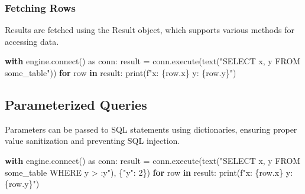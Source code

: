 \documentclass[
  letterpaper,
  DIV=11,
  numbers=noendperiod]{scrreprt}
\newenvironment{Shaded}{\begin{snugshade}}{\end{snugshade}}
\newcommand{\BuiltInTok}[1]{\textcolor[rgb]{0.00,0.23,0.31}{#1}}
\newcommand{\ControlFlowTok}[1]{\textcolor[rgb]{0.00,0.23,0.31}{\textbf{#1}}}
\newcommand{\DecValTok}[1]{\textcolor[rgb]{0.68,0.00,0.00}{#1}}
\newcommand{\ExtensionTok}[1]{\textcolor[rgb]{0.00,0.23,0.31}{#1}}
\newcommand{\ImportTok}[1]{\textcolor[rgb]{0.00,0.46,0.62}{#1}}
\newcommand{\KeywordTok}[1]{\textcolor[rgb]{0.00,0.23,0.31}{\textbf{#1}}}
\newcommand{\NormalTok}[1]{\textcolor[rgb]{0.00,0.23,0.31}{#1}}
\newcommand{\OperatorTok}[1]{\textcolor[rgb]{0.37,0.37,0.37}{#1}}
\newcommand{\SpecialCharTok}[1]{\textcolor[rgb]{0.37,0.37,0.37}{#1}}
\newcommand{\SpecialStringTok}[1]{\textcolor[rgb]{0.13,0.47,0.30}{#1}}
\newcommand{\StringTok}[1]{\textcolor[rgb]{0.13,0.47,0.30}{#1}}
\begin{document}
\subsubsection{Fetching Rows}\label{fetching-rows}

Results are fetched using the Result object, which supports various
methods for accessing data.

\begin{Shaded}
\begin{Highlighting}[]
\ControlFlowTok{with}\NormalTok{ engine.}\ExtensionTok{connect}\NormalTok{() }\ImportTok{as}\NormalTok{ conn:}
\NormalTok{    result }\OperatorTok{=}\NormalTok{ conn.execute(text(}\StringTok{"SELECT x, y FROM some\_table"}\NormalTok{))}
    \ControlFlowTok{for}\NormalTok{ row }\KeywordTok{in}\NormalTok{ result:}
        \BuiltInTok{print}\NormalTok{(}\SpecialStringTok{f"x: }\SpecialCharTok{\{}\NormalTok{row}\SpecialCharTok{.}\NormalTok{x}\SpecialCharTok{\}}\SpecialStringTok{  y: }\SpecialCharTok{\{}\NormalTok{row}\SpecialCharTok{.}\NormalTok{y}\SpecialCharTok{\}}\SpecialStringTok{"}\NormalTok{)}
\end{Highlighting}
\end{Shaded}

\subsection{Parameterized Queries}\label{parameterized-queries}

Parameters can be passed to SQL statements using dictionaries, ensuring
proper value sanitization and preventing SQL injection.

\begin{Shaded}
\begin{Highlighting}[]
\ControlFlowTok{with}\NormalTok{ engine.}\ExtensionTok{connect}\NormalTok{() }\ImportTok{as}\NormalTok{ conn:}
\NormalTok{    result }\OperatorTok{=}\NormalTok{ conn.execute(text(}\StringTok{"SELECT x, y FROM some\_table WHERE y \textgreater{} :y"}\NormalTok{), \{}\StringTok{"y"}\NormalTok{: }\DecValTok{2}\NormalTok{\})}
    \ControlFlowTok{for}\NormalTok{ row }\KeywordTok{in}\NormalTok{ result:}
        \BuiltInTok{print}\NormalTok{(}\SpecialStringTok{f"x: }\SpecialCharTok{\{}\NormalTok{row}\SpecialCharTok{.}\NormalTok{x}\SpecialCharTok{\}}\SpecialStringTok{  y: }\SpecialCharTok{\{}\NormalTok{row}\SpecialCharTok{.}\NormalTok{y}\SpecialCharTok{\}}\SpecialStringTok{"}\NormalTok{)}
\end{Highlighting}
\end{Shaded}
\end{document}
